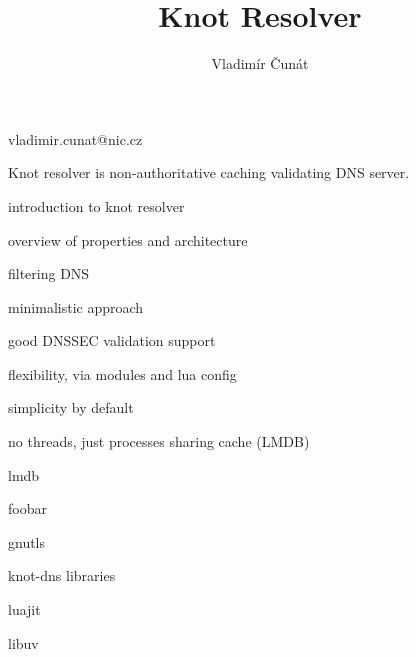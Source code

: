 
\englishenv

\pageAspectRatio[16:9]


\title{Knot Resolver} %
\author{Vladimír Čunát}{vladimir.cunat@nic.cz}
\date[2018-05-23]


\slide[Contents]

Knot resolver is non-authoritative caching validating DNS server.

\bulletList
\item introduction to knot resolver

\item overview of properties and architecture

\item filtering DNS

\endBulletList


\bulletList
\item minimalistic approach

\item good DNSSEC validation support

\item flexibility, via modules and lua config

\item simplicity by default

\endBulletList


\slide[Architecture]
\bulletList
\item no threads, just processes sharing cache (LMDB)

\item lmdb
	\par foobar
\item gnutls
\item knot-dns libraries
\item luajit
\item libuv

\endBulletList



\bye
